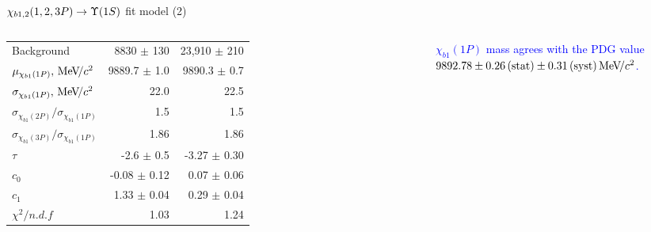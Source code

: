 \begin{frame}{$\chi_{b1,2}(1,2,3P) \to \OneS$ fit model (2)}
\begin{columns}[T]
{\begin{tabular}{lrr}
\rule{0pt}{4ex}Background & 8830 $\pm$ 130 & 23,910 $\pm$ 210\\

\rule{0pt}{4ex}$\mu_{\chi_{b 1}(1P)}, {\mathrm{\,Me\kern -0.1em V\!/}c^2}$ & 9889.7 $\pm$ 1.0 & 9890.3 $\pm$ 0.7\\
$\sigma_{\chi_{b 1}(1P)}, {\mathrm{\,Me\kern -0.1em V\!/}c^2}$ & 22.0 & 22.5\\
$\sigma_{\chi_{b1}(2P)} / \sigma_{\chi_{b1}(1P)}$ & 1.5 & 1.5\\
$\sigma_{\chi_{b1}(3P)} / \sigma_{\chi_{b1}(1P)}$ & 1.86 & 1.86\\

\rule{0pt}{4ex}$\tau$ & -2.6 $\pm$ 0.5 & -3.27 $\pm$ 0.30\\
$c_0$ & -0.08 $\pm$ 0.12 & 0.07 $\pm$ 0.06\\
$c_1$ & 1.33 $\pm$ 0.04 & 0.29 $\pm$ 0.04\\

\rule{0pt}{4ex}$\chi^2 / n.d.f$ & 1.03 & 1.24\\
\bottomrule
\end{tabular}
} %

\bigskip

{\tiny \textcolor{blue}{ $\chi_{b1}(1P)$ mass agrees with the PDG value
$9892.78 \pm 0.26\mathrm{\,(stat)} \pm0.31\mathrm{\,(syst)} {\mathrm{\,Me\kern -0.1em V\!/}c^2}$.}}
\end{columns}


\end{frame}
